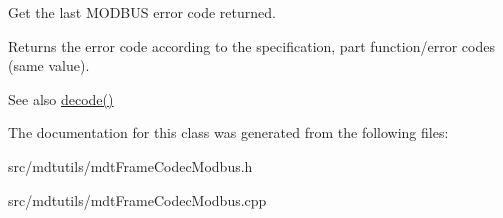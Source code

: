 Get the last MODBUS error code returned. 

Returns the error code according to the specification, part function/error codes (same value). \begin{DoxySeeAlso}{See also}
\hyperlink{classmdt_frame_codec_modbus_a426f465363a49d70890a462b40677787}{decode()} 
\end{DoxySeeAlso}


The documentation for this class was generated from the following files:\begin{DoxyCompactItemize}
\item 
src/mdtutils/mdtFrameCodecModbus.h\item 
src/mdtutils/mdtFrameCodecModbus.cpp\end{DoxyCompactItemize}

